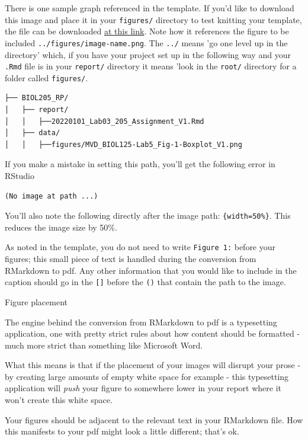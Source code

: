 \documentclass[
]{book}
\begin{document}
There is one sample graph referenced in the template. If you'd like to download this image and place it in your \texttt{figures/} directory to test knitting your template, the file can be downloaded \href{https://osf.io/download/nrzdu}{at this link}. Note how it references the figure to be included \texttt{../figures/image-name.png}. The \texttt{../} means 'go one level up in the directory' which, if you have your project set up in the following way and your \texttt{.Rmd} file is in your \texttt{report/} directory it means 'look in the \texttt{root/} directory for a folder called \texttt{figures/}.

\begin{verbatim}
├── BIOL205_RP/
│   ├── report/
│   │   ├──20220101_Lab03_205_Assignment_V1.Rmd
│   ├── data/
│   │   ├──figures/MVD_BIOL125-Lab5_Fig-1-Boxplot_V1.png
\end{verbatim}

If you make a mistake in setting this path, you'll get the following error in RStudio

\begin{verbatim}
(No image at path ...)
\end{verbatim}

You'll also note the following directly after the image path: \texttt{\{width=50\%\}}. This reduces the image size by 50\%.

As noted in the template, you do not need to write \texttt{Figure\ 1:} before your figures; this small piece of text is handled during the conversion from RMarkdown to pdf. Any other information that you would like to include in the caption should go in the \texttt{{[}{]}} before the \texttt{()} that contain the path to the image.

Figure placement

The engine behind the conversion from RMarkdown to pdf is a typesetting application, one with pretty strict rules about how content should be formatted - much more strict than something like Microsoft Word.

What this means is that if the placement of your images will disrupt your prose - by creating large amounts of empty white space for example - this typesetting application will \emph{push} your figure to somewhere lower in your report where it won't create this white space.

Your figures should be adjacent to the relevant text in your RMarkdown file. How this manifests to your pdf might look a little different; that's ok.
\end{document}
